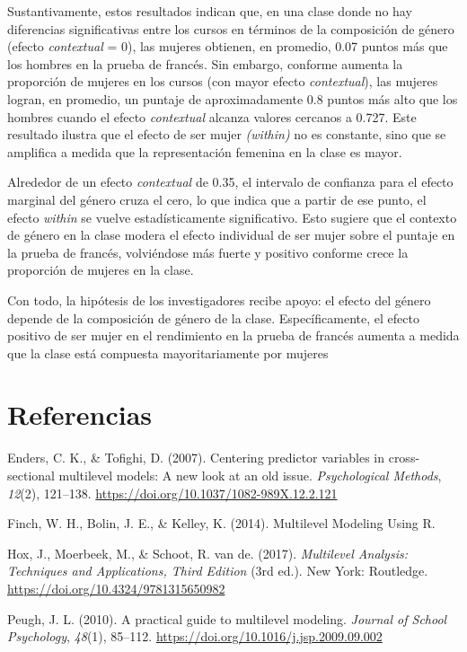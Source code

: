 \documentclass[
  12pt,
  a4paper,
]{article}
\newlength{\cslhangindent}
\newlength{\cslentryspacingunit} %
\newenvironment{CSLReferences}[2] %
 {%
  \setlength{\parindent}{0pt}
  \ifodd #1
  \let\oldpar\par
  \def\par{\hangindent=\cslhangindent\oldpar}
  \fi
  \setlength{\parskip}{#2\cslentryspacingunit}
 }%
 {}
\begin{document}
Sustantivamente, estos resultados indican que, en una clase donde no hay diferencias significativas entre los cursos en términos de la composición de género (efecto \emph{contextual} = 0), las mujeres obtienen, en promedio, 0.07 puntos más que los hombres en la prueba de francés. Sin embargo, conforme aumenta la proporción de mujeres en los cursos (con mayor efecto \emph{contextual}), las mujeres logran, en promedio, un puntaje de aproximadamente 0.8 puntos más alto que los hombres cuando el efecto \emph{contextual} alcanza valores cercanos a 0.727. Este resultado ilustra que el efecto de ser mujer \emph{(within)} no es constante, sino que se amplifica a medida que la representación femenina en la clase es mayor.

Alrededor de un efecto \emph{contextual} de 0.35, el intervalo de confianza para el efecto marginal del género cruza el cero, lo que indica que a partir de ese punto, el efecto \emph{within} se vuelve estadísticamente significativo. Esto sugiere que el contexto de género en la clase modera el efecto individual de ser mujer sobre el puntaje en la prueba de francés, volviéndose más fuerte y positivo conforme crece la proporción de mujeres en la clase.

Con todo, la hipótesis de los investigadores recibe apoyo: el efecto del género depende de la composición de género de la clase. Específicamente, el efecto positivo de ser mujer en el rendimiento en la prueba de francés aumenta a medida que la clase está compuesta mayoritariamente por mujeres

\hypertarget{referencias}{%
\section{Referencias}\label{referencias}}

\hypertarget{refs}{}
\begin{CSLReferences}{1}{0}
\leavevmode{}%
Enders, C. K., \& Tofighi, D. (2007). Centering predictor variables in cross-sectional multilevel models: {A} new look at an old issue. \emph{Psychological Methods}, \emph{12}(2), 121--138. \url{https://doi.org/10.1037/1082-989X.12.2.121}

\leavevmode{}%
Finch, W. H., Bolin, J. E., \& Kelley, K. (2014). Multilevel {Modeling Using R}.

\leavevmode{}%
Hox, J., Moerbeek, M., \& Schoot, R. van de. (2017). \emph{Multilevel {Analysis}: {Techniques} and {Applications}, {Third Edition}} (3rd ed.). New York: Routledge. \url{https://doi.org/10.4324/9781315650982}

\leavevmode{}%
Peugh, J. L. (2010). A practical guide to multilevel modeling. \emph{Journal of School Psychology}, \emph{48}(1), 85--112. \url{https://doi.org/10.1016/j.jsp.2009.09.002}

\end{CSLReferences}
\end{document}
